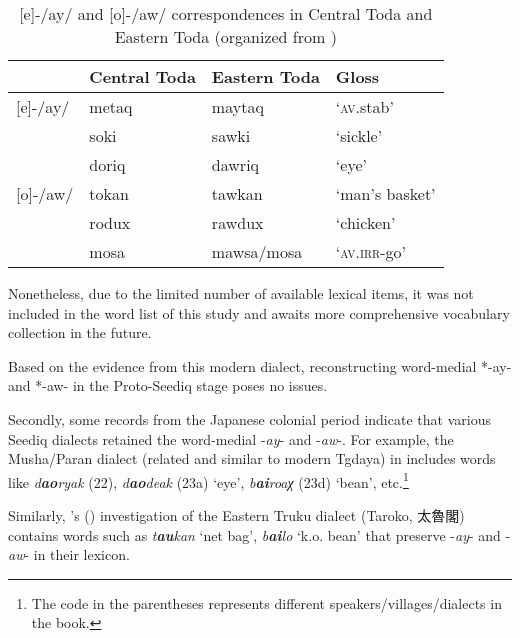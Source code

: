 \documentclass[12pt]{article}
\newcommand{\psedf}{Proto-Seediq\xspace}
\begin{document}
\begin{table}[!htbp]
\centering
\caption{[e]-/ay/ and [o]-/aw/ correspondences in Central Toda and Eastern Toda (organized from \cite[95-96]{lee2012tawsa})}
\label{tab:ctoeto}
\begin{tabular}{llll}
\hline
                              & Central Toda & Eastern Toda & Gloss                                 \\ \hline
{[}e{]}-/ay/                  & metaq        & maytaq       & `\textsc{av}.stab'   \\ \hline
\multirow{5}{*}{{[}o{]}-/aw/} & soki         & sawki        & `sickle'                              \\
                              & doriq        & dawriq       & `eye'                                 \\
                              & tokan        & tawkan       & `man's basket'                        \\
                              & rodux        & rawdux       & `chicken'                             \\
                              & mosa         & mawsa/mosa   & `\textsc{av.irr}-go' \\ \hline
\end{tabular}
\end{table}

Nonetheless, due to the limited number of available lexical items, it was not included in the word list of this study and awaits more comprehensive vocabulary collection in the future. 

Based on the evidence from this modern dialect, reconstructing word-medial *-ay- and *-aw- in the \psedf stage poses no issues.

Secondly, some records from the Japanese colonial period indicate that various Seediq dialects retained the word-medial -\textit{ay}- and -\textit{aw}-. For example, the Musha/Paran dialect (related and similar to modern Tgdaya) in \textcite{ogawa2006voc} includes words like \textit{d\textbf{ao}ryak} (22), \textit{d\textbf{ao}deak} (23a) `eye', \textit{b\textbf{ai}roaχ} (23d) `bean', etc.\footnote{The code in the parentheses represents different speakers/villages/dialects in the book.} 

Similarly, \citeauthor{tashiro1900easterntw}'s (\citeyear{tashiro1900easterntw}) investigation of the Eastern Truku dialect (Taroko, 太魯閣) contains words such as \textit{t\textbf{au}kan} `net bag', \textit{b\textbf{ai}lo} `k.o. bean' that preserve -\textit{ay}- and -\textit{aw}- in their lexicon. 
\end{document}
